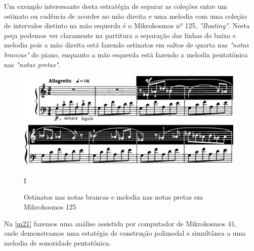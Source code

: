 \documentclass[
	12pt,				%
	openright,			%
	twoside,			%
	a4paper,			%
	english,			%
	french,				%
	spanish,			%
	brazil				%
	]{abntex2}
\begin{document}
\pagebreak
Um exemplo interessante desta estratégia de separar as coleções entre um ostinato ou cadência de acordes no mão direita e uma melodia com uma coleção de intervalos distinto na mão esquerda é o Mikrokosmos nº 125, \textit{"Boating"}. Nesta peça podemos ver claramente na partitura a separação das linhas do baixo e melodia pois a mão direita está fazendo ostinatos em saltos de quarta nas \textit{"notas brancas"} do piano, enquanto a mão esquerda está fazendo a melodia pentatônica nas \textit{"notas pretas"}. 

\begin{figure}[!h]
	\caption{\label{fig_grafico}Ostinatos nas notas brancas e melodia nas notas pretas em Mikrokosmos 125 }
	\begin{center}
	    \includegraphics[scale=0.45]{ostinatos/boating_ostinato.png}
	\end{center}
	I
\end{figure}

Na \autoref{m21} fazemos uma análise assistida por computador de Mikrokosmos 41, onde demonstramos uma estatégia de construção polimodal e simultânea a uma melodia de sonoridade pentatônica.








%
%
%
\end{document}

